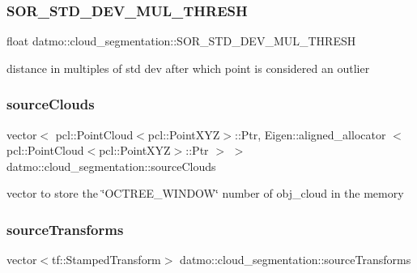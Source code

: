 \subsubsection{\texorpdfstring{S\+O\+R\+\_\+\+S\+T\+D\+\_\+\+D\+E\+V\+\_\+\+M\+U\+L\+\_\+\+T\+H\+R\+E\+SH}{SOR\_STD\_DEV\_MUL\_THRESH}}
{\footnotesize\ttfamily float datmo\+::cloud\+\_\+segmentation\+::\+S\+O\+R\+\_\+\+S\+T\+D\+\_\+\+D\+E\+V\+\_\+\+M\+U\+L\+\_\+\+T\+H\+R\+E\+SH\hspace{0.3cm}{\ttfamily [protected]}}



distance in multiples of std dev after which point is considered an outlier 

\mbox{\label{classdatmo_1_1cloud__segmentation_abcf359aaf4f17128e961473692d9c473}} 
\subsubsection{\texorpdfstring{source\+Clouds}{sourceClouds}}
{\footnotesize\ttfamily vector$<$ pcl\+::\+Point\+Cloud$<$pcl\+::\+Point\+X\+YZ$>$\+::Ptr, Eigen\+::aligned\+\_\+allocator $<$pcl\+::\+Point\+Cloud$<$pcl\+::\+Point\+X\+YZ$>$\+::Ptr $>$ $>$ datmo\+::cloud\+\_\+segmentation\+::source\+Clouds\hspace{0.3cm}{\ttfamily [protected]}}



vector to store the \char`\"{}\+O\+C\+T\+R\+E\+E\+\_\+\+W\+I\+N\+D\+O\+W\char`\"{} number of obj\+\_\+cloud in the memory 

\mbox{\label{classdatmo_1_1cloud__segmentation_a24a81e37b2eff06482f65b09e39af9e4}} 
\subsubsection{\texorpdfstring{source\+Transforms}{sourceTransforms}}
{\footnotesize\ttfamily vector$<$tf\+::\+Stamped\+Transform$>$ datmo\+::cloud\+\_\+segmentation\+::source\+Transforms\hspace{0.3cm}{\ttfamily [protected]}}



